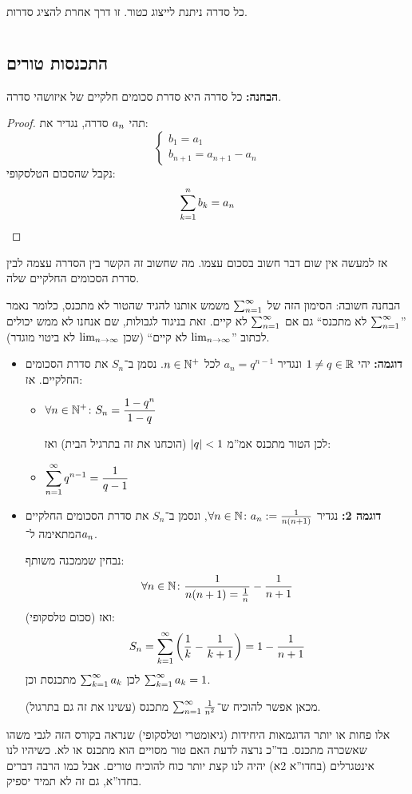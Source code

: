 \documentclass[name=רשימות חשבון דיפרנציאלי ואינטגרלי 1א]{../../../tex/classes/megasumPreamble}
\begin{document}
	כל סדרה ניתנת לייצוג כטור. זו דרך אחרת להציג סדרות.


	
	\section[טורים]{}
	\subsection{התכנסות טורים}

	\textbf{הבחנה: }כל סדרה היא סדרת סכומים חלקיים של איזושהי סדרה. \begin{proof}
		תהי $a_n$ סדרה, נגדיר את:
		\[ \begin{cases}
			b_1 = a_1 \\
			b_{n + 1} = a_{n + 1} - a_n
		\end{cases} \]
		נקבל שהסכום הטלסקופי:
		\[ \sum_{k = 1}^{n} b_k = a_n \]
	\end{proof}
	אז למעשה אין שום דבר חשוב בסכום עצמו. מה שחשוב זה הקשר בין הסדרה עצמה לבין סדרת הסכומים החלקיים שלה.

	הבחנה חשובה: הסימון הזה של $\sum_{n = 1}^{\infty}$ משמש אותנו להגיד שהטור לא מתכנס, כלומר נאמר ''$\sum_{n = 1}^{\infty}$ לא מתכנס`` גם אם $\sum_{n = 1}^{\infty}$ לא קיים. זאת בניגוד לגבולות, שם אנחנו לא ממש יכולים לכתוב ''$\lim_{n \to \infty}$ לא קיים`` (שכן $\lim_{n \to \infty}$ לא ביטוי מוגדר).

	\begin{itemize}
		\item \textbf{דוגמה: }יהי $1 \neq q \in \mathbb{R}$ ונגדיר $a_n = q^{n - 1}$ לכל $n\in \mathbb{N}^{+}$. נסמן ב־$S_n$ את סדרת הסכומים החלקיים. אז:
		\begin{itemize}
			\item \hfil $\displaystyle \forall n \in \mathbb{N}^{+} \colon S_n = \frac{1 - q^{n}}{1 - q}$

			לכן הטור מתכנס אמ''מ $\left \lvert q \right \rvert < 1$ (הוכחנו את זה בתרגיל הבית) ואז:
			\item \hfil $\displaystyle \sum_{n = 1}^{\infty} q^{n - 1} = \frac{1}{q - 1}$
		\end{itemize}
		\item \textbf{דוגמה 2: }נגדיר $\forall n \in \mathbb{N} \colon a_n := \frac{1}{n(n + 1)}$, ונסמן ב־$S_n$ את סדרת הסכומים החלקיים המתאימה ל־$a_n$.

		נבחין שממכנה משותף:
		\[ \forall n \in \mathbb{N} \colon \frac{1}{n(n + 1) = \frac{1}{n}} - \frac{1}{n + 1} \]
		ואז (סכום טלסקופי):
		\[ S_n = \sum_{k = 1}^{\infty} \left ( \frac{1}{k} - \frac{1}{k + 1} \right ) = 1 - \frac{1}{n + 1} \]
		לכן $\sum_{k = 1}^{\infty} a_k$ מתכנסת וכן $\sum_{k = 1}^{\infty} a_k = 1$.

		מכאן אפשר להוכיח ש־$\sum_{n = 1}^{\infty} \frac{1}{n^2}$ מתכנס (עשינו את זה גם בתרגול).
	\end{itemize}
	אלו פחות או יותר הדוגמאות היחידות (גיאומטרי וטלסקופי) שנראה בקורס הזה לגבי משהו שאשכרה מתכנס. בד''כ נרצה לדעת האם טור מסויים הוא מתכנס או לא. כשיהיו לנו אינטגרלים (בחדו''א 2א) יהיה לנו קצת יותר כוח להוכיח טורים. אבל כמו הרבה דברים בחדו''א, גם זה לא תמיד יספיק.
\end{document}
